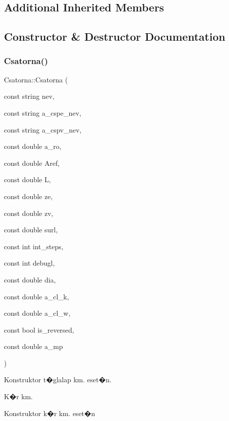 \subsection*{Additional Inherited Members}


\subsection{Constructor \& Destructor Documentation}
\mbox{\label{class_csatorna_ae3829a74761e0507363290fde29af12b}} 
\subsubsection{\texorpdfstring{Csatorna()}{Csatorna()}}
{\footnotesize\ttfamily Csatorna\+::\+Csatorna (\begin{DoxyParamCaption}\item[{const string}]{nev,  }\item[{const string}]{a\+\_\+cspe\+\_\+nev,  }\item[{const string}]{a\+\_\+cspv\+\_\+nev,  }\item[{const double}]{a\+\_\+ro,  }\item[{const double}]{Aref,  }\item[{const double}]{L,  }\item[{const double}]{ze,  }\item[{const double}]{zv,  }\item[{const double}]{surl,  }\item[{const int}]{int\+\_\+steps,  }\item[{const int}]{debugl,  }\item[{const double}]{dia,  }\item[{const double}]{a\+\_\+cl\+\_\+k,  }\item[{const double}]{a\+\_\+cl\+\_\+w,  }\item[{const bool}]{is\+\_\+reversed,  }\item[{const double}]{a\+\_\+mp }\end{DoxyParamCaption})}



Konstruktor t�glalap km. eset�n. 

K�r km.

Konstruktor k�r km. eset�n \mbox{\label{class_csatorna_a84452f3df42df853e0600d383cd37d8a}} 
